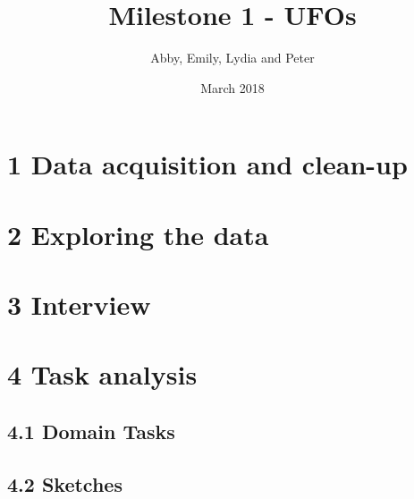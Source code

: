 \documentclass{neu_handout}
\title{Milestone 1 - UFOs}
\author{Abby, Emily, Lydia and Peter}
\date{March 2018}
\begin{document}
\section*{1 Data acquisition and clean-up}



\section*{2 Exploring the data}




\section*{3 Interview}



\section*{4 Task analysis}

\subsection*{4.1 Domain Tasks}

\subsection*{4.2 Sketches}
\end{document}
